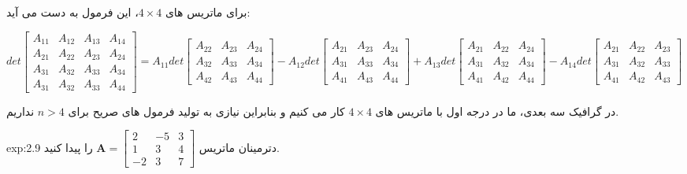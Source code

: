 {\begin{spacing}{1.3}
        برای ماتریس های $4\times 4$، این فرمول به دست می آید:

        \begin{flushleft}
            $det\begin{bmatrix}
                    A_{11} & A_{12} & A_{13} & A_{14} \\
                    A_{21} & A_{22} & A_{23} & A_{24} \\
                    A_{31} & A_{32} & A_{33} & A_{34} \\
                    A_{31} & A_{32} & A_{33} & A_{44}
            \end{bmatrix}=A_{11}det\begin{bmatrix}
                                       A_{22} & A_{23} & A_{24} \\
                                       A_{32} & A_{33} & A_{34} \\
                                       A_{42} & A_{43} & A_{44}
            \end{bmatrix}-A_{12}det\begin{bmatrix}
                                       A_{21} & A_{23} & A_{24} \\
                                       A_{31} & A_{33} & A_{34} \\
                                       A_{41} & A_{43} & A_{44}
            \end{bmatrix}+A_{13}det\begin{bmatrix}
                                       A_{21} & A_{22} & A_{24} \\
                                       A_{31} & A_{32} & A_{34} \\
                                       A_{41} & A_{42} & A_{44}
            \end{bmatrix}-A_{14}det\begin{bmatrix}
                                       A_{21} & A_{22} & A_{23} \\
                                       A_{31} & A_{32} & A_{33} \\
                                       A_{41} & A_{42} & A_{43}
            \end{bmatrix}$
        \end{flushleft}

        در گرافیک سه بعدی، ما در درجه اول با ماتریس های $4\times 4$ کار می کنیم و بنابراین نیازی به تولید فرمول های صریح برای $n>4$ نداریم.

        \begin{example}{exp:2.9}
            \Large
            دترمینان ماتریس $\textbf{A}=\begin{bmatrix}
                                            2  & -5 & 3 \\
                                            1  & 3  & 4 \\
                                            -2 & 3  & 7
            \end{bmatrix}$ را پیدا کنید.


\end{example}
\end{spacing}}
